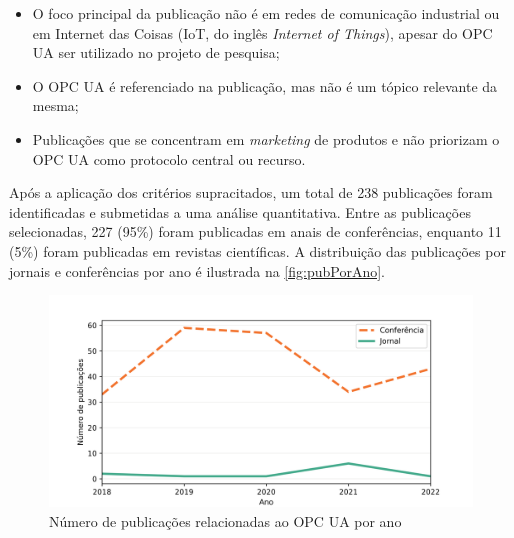     \begin{itemize}
        \item O foco principal da publicação não é em redes de comunicação industrial ou em Internet das Coisas (IoT, do inglês \textit{Internet of Things}), apesar do OPC UA ser utilizado no projeto de pesquisa;
        \item O OPC UA é referenciado na publicação, mas não é um tópico relevante da mesma;
        \item Publicações que se concentram em \textit{marketing} de produtos e não priorizam o OPC UA como protocolo central ou recurso.
    \end{itemize}

    Após a aplicação dos critérios supracitados, um total de 238 publicações foram identificadas e submetidas a uma análise quantitativa. Entre as publicações selecionadas, 227 (95\%) foram publicadas em anais de conferências, enquanto 11 (5\%) foram publicadas em revistas científicas. A distribuição das publicações por jornais e conferências por ano é ilustrada na \autoref{fig:pubPorAno}.

    

    \begin{figure}[htbp]
        \caption{Número de publicações relacionadas ao OPC UA por ano}
        \label{fig:pubPorAno}
        \begin{center}
            \includegraphics[width=0.7\linewidth]{USPSC-img/pubPerYear.png}
        \end{center}
    \end{figure}

